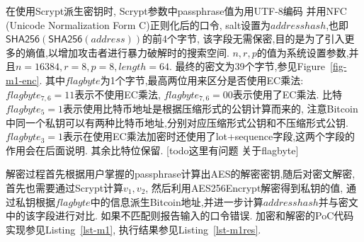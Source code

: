 在使用Scrypt派生密钥时, Scrypt参数中passphrase值为用UTF-8编码
并用NFC (Unicode Normalization Form C)正则化后的口令,
salt设置为$addresshash$,也即$ \textsf{SHA256}(\textsf{SHA256}(address))$的前4个字节, 
该字段无需保密,目的是为了引入更多的熵值,以增加攻击者进行暴力破解时的搜索空间.
$n, r, p$的值为系统设置参数,并且$n=16384, r=8, p=8, length=64$.
最终的密文为39个字节,参见Figure~\ref{fig-m1-enc}.
其中$flagbyte$为1个字节,最高两位用来区分是否使用EC乘法:
$flagbyte_{7,6}=11$表示不使用EC乘法,
$flagbyte_{7,6}=00$表示使用了EC乘法.
比特$flagbyte_{5}=1$表示使用比特币地址是根据压缩形式的公钥计算而来的,
注意Bitcoin中同一个私钥可以有两种比特币地址,分别对应压缩形式公钥和不压缩形式公钥.
$flagbyte_{3}=1$表示在使用EC乘法加密时还使用了lot+sequence字段,这两个字段的作用会在后面说明.
其余比特位保留.
[todo这里有问题 关于flagbyte]



解密过程首先根据用户掌握的passphrase计算出AES的解密密钥,随后对密文解密,
首先也需要通过Scrypt计算$v_1, v_2$, 然后利用\textsf{AES256Encrypt}解密得到私钥的值,
通过私钥根据$flagbyte$中的信息派生Bitcoin地址,并进一步计算$addresshash$并与密文中的该字段进行对比.
如果不匹配则报告输入的口令错误. 加密和解密的PoC代码实现参见Listing~\ref{lst-m1},
执行结果参见Listing~\ref{lst-m1res}.


